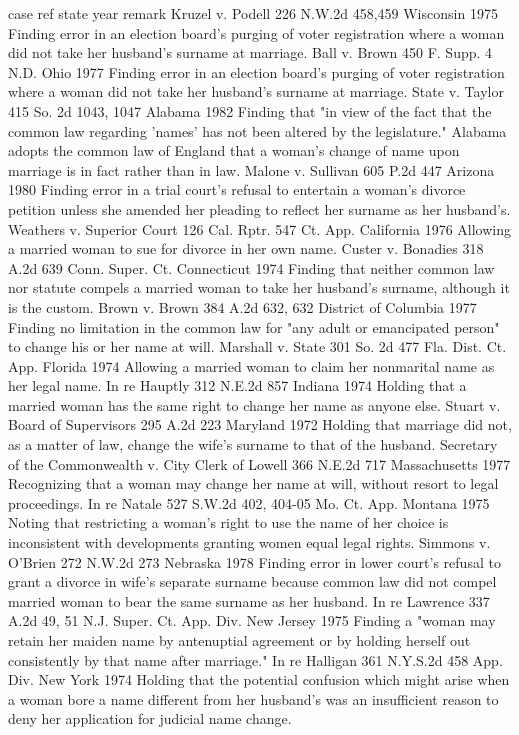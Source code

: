 case	ref	state	year	remark
Kruzel v. Podell	226 N.W.2d 458,459	Wisconsin	1975	Finding error in an election board's purging of voter registration where a woman did not take her husband's surname at marriage.
Ball v. Brown	450 F. Supp. 4 N.D.	Ohio	1977	Finding error in an election board's purging of voter registration where a woman did not take her husband's surname at marriage.
State v. Taylor	415 So. 2d 1043, 1047	Alabama	1982	Finding that "in view of the fact that the common law regarding 'names' has not been altered by the legislature." Alabama adopts the common law of England that a woman's change of name upon marriage is in fact rather than in law.
Malone v. Sullivan	605 P.2d 447	Arizona	1980	Finding error in a trial court's refusal to entertain a woman's divorce petition unless she amended her pleading to reflect her surname as her husband's.
Weathers v. Superior Court	126 Cal. Rptr. 547 Ct. App.	California	1976	Allowing a married woman to sue for divorce in her own name.
Custer v. Bonadies	318 A.2d 639 Conn. Super. Ct.	Connecticut	1974	Finding that neither common law nor statute compels a married woman to take her husband's surname, although it is the custom.
Brown v. Brown	384 A.2d 632, 632	District of Columbia	1977	Finding no limitation in the common law for "any adult or emancipated person" to change his or her name at will.
Marshall v. State	301 So. 2d 477 Fla. Dist. Ct. App.	Florida	1974	Allowing a married woman to claim her nonmarital name as her legal name.
In re Hauptly	312 N.E.2d 857	Indiana	1974	Holding that a married woman has the same right to change her name as anyone else.
Stuart v. Board of Supervisors	295 A.2d 223	Maryland	1972	Holding that marriage did not, as a matter of law, change the wife's surname to that of the husband.
Secretary of the Commonwealth v. City Clerk of Lowell	366 N.E.2d 717	Massachusetts	1977	Recognizing that a woman may change her name at will, without resort to legal proceedings.
In re Natale	527 S.W.2d 402, 404-05 Mo. Ct. App.	Montana	1975	Noting that restricting a woman's right to use the name of her choice is inconsistent with developments granting women equal legal rights.
Simmons v. O'Brien	272 N.W.2d 273	Nebraska	1978	Finding error in lower court's refusal to grant a divorce in wife's separate surname because common law did not compel married woman to bear the same surname as her husband.
In re Lawrence	337 A.2d 49, 51 N.J. Super. Ct. App. Div.	New Jersey	1975	Finding a "woman may retain her maiden name by antenuptial agreement or by holding herself out consistently by that name after marriage."
In re Halligan	361 N.Y.S.2d 458 App. Div.	New York	1974	Holding that the potential confusion which might arise when a woman bore a name different from her husband's was an insufficient reason to deny her application for judicial name change.
